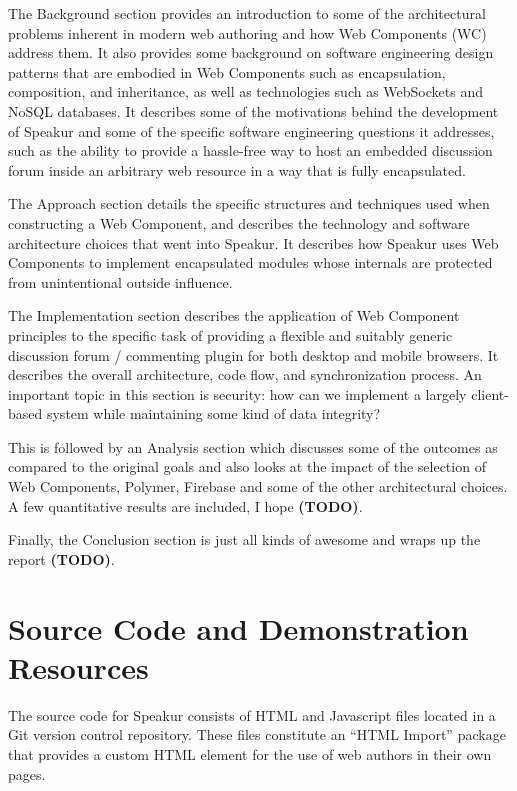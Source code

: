 The Background section provides an introduction to some of the architectural problems inherent in modern web authoring and how Web Components (WC) address them. 
It also provides some background on software engineering design patterns that are embodied in Web Components such as encapsulation, composition, and inheritance, as well as technologies such as WebSockets and NoSQL databases.
It describes some of the motivations behind the development of Speakur and some of the specific software engineering questions it addresses, such as the ability to provide a hassle-free way to host an embedded discussion forum inside an arbitrary web resource in a way that is fully encapsulated.

The Approach section details the specific structures and techniques used when constructing a Web Component, and describes the technology and software architecture choices that went into Speakur. 
It describes how Speakur uses Web Components to implement encapsulated modules whose internals are protected from unintentional outside influence.

The Implementation section describes the application of Web Component principles to the specific task of providing a flexible and suitably generic discussion forum / commenting plugin for both desktop and mobile browsers. 
It describes the overall architecture, code flow, and synchronization process.
An important topic in this section is security: how can we implement a largely client-based system while maintaining some kind of data integrity?

This is followed by an Analysis section which discusses some of the outcomes as compared to the original goals and also looks at the impact of the selection of Web Components, Polymer, Firebase and some of the other architectural choices. 
A few quantitative results are included, I hope \textbf{(TODO)}.

Finally, the Conclusion section is just all kinds of awesome and wraps up the report \textbf{(TODO)}. 

\section{Source Code and Demonstration Resources}
%

The source code for Speakur consists of HTML and Javascript files located in a Git version control repository. 
These files constitute an ``HTML Import'' package that provides a
\textbf{}
custom HTML element for the use of web authors in their own pages.

